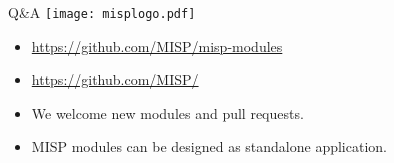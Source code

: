 \begin{frame}[t,fragile] {Q\&A}
\texttt{[image: misplogo.pdf]}
\begin{itemize}
        \item \url{https://github.com/MISP/misp-modules}
        \item \url{https://github.com/MISP/}
        \item We welcome new modules and pull requests.
        \item MISP modules can be designed as standalone application.
\end{itemize}

\end{frame}
